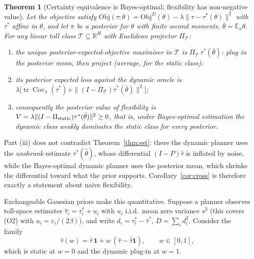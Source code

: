\documentclass[11pt]{article}
\newtheorem{theorem}{Theorem}[section]
\theoremstyle{definition}
\theoremstyle{remark}
\newcommand{\E}{\mathbb{E}}
\newcommand{\Cov}{\operatorname{Cov}}
\newcommand{\R}{\mathbb{R}}
\newcommand{\one}{\mathbf{1}}
\newcommand{\tr}{\operatorname{tr}}
\begin{document}
\begin{theorem}[Certainty equivalence is Bayes-optimal; flexibility has non-negative value]\label{thm:bayes}
Let the objective satisfy $\mathrm{Obj}(\tau;\theta)=\mathrm{Obj}^D(\theta)-\lambda\|\tau-\tau^*(\theta)\|^2$ with $\tau^*$ affine in $\theta$, and let $\pi$ be a posterior for $\theta$ with finite second moments, $\bar\theta=\E_\pi\theta$. For any linear toll class $\mathcal T\subseteq\R^H$ with Euclidean projector $\Pi_{\mathcal T}$:
\begin{enumerate}[label=(\roman*)]
\item the unique posterior-expected-objective maximiser in $\mathcal T$ is $\Pi_{\mathcal T}\,\tau^*(\bar\theta)$: plug in the posterior mean, then project (average, for the static class);
\item its posterior expected loss against the dynamic oracle is $\lambda\big[\tr\Cov_\pi(\tau^*)+\|(I-\Pi_{\mathcal T})\tau^*(\bar\theta)\|^2\big]$;
\item consequently the posterior value of flexibility is $V=\lambda\|(I-\Pi_{\rm static})\tau^*(\bar\theta)\|^2\ge0$, that is, under Bayes-optimal estimation the dynamic class weakly dominates the static class for every posterior.
\end{enumerate}
\end{theorem}

Part (iii) does not contradict Theorem~\ref{thm:est}: there the dynamic planner uses the \emph{unshrunk} estimate $\tau^*(\hat\theta)$, whose differential $(I-P)\hat\tau$ is inflated by noise, while the Bayes-optimal dynamic planner uses the posterior mean, which shrinks the differential toward what the prior supports. Corollary~\ref{cor:cross} is therefore exactly a statement about naive flexibility.

Exchangeable Gaussian priors make this quantitative. Suppose a planner observes toll-space estimates $\hat\tau_i=\tau^*_i+u_i$ with $u_i$ i.i.d.\ mean zero variance $s^2$ (this covers (O2) with $u_i=\varepsilon_i/(2\beta)$), and write $d_i=\tau^*_i-\bar\tau^*$, $D=\sum_id_i^2$. Consider the family
\begin{equation}\label{eq:shrink}
\hat\tau(w)=\bar{\hat\tau}\,\one+w\,(\hat\tau-\bar{\hat\tau}\one),\qquad w\in[0,1],
\end{equation}
which is static at $w=0$ and the dynamic plug-in at $w=1$.
\end{document}

